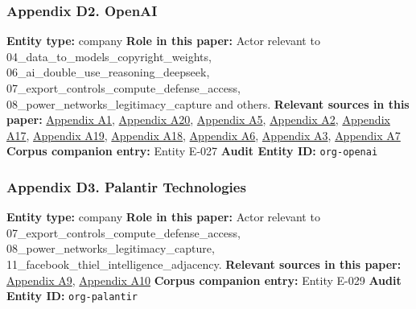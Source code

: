 \documentclass[
  american,
  11pt,
  letterpaper,
]{article}
\begin{document}
\subsubsection{Appendix D2. OpenAI}\label{appendix-d2-openai}

\textbf{Entity type:} company \textbf{Role in this paper:} Actor
relevant to 04\_data\_to\_models\_copyright\_weights,
06\_ai\_double\_use\_reasoning\_deepseek,
07\_export\_controls\_compute\_defense\_access,
08\_power\_networks\_legitimacy\_capture and others. \textbf{Relevant
sources in this paper:}
\hyperref[appendix-a1-openai-announces-leadership-transition]{Appendix
A1},
\hyperref[appendix-a20-openais-proposals-for-the-us-ai-action-plan]{Appendix
A20},
\hyperref[appendix-a5-openai-board-forms-safety-and-security-committee]{Appendix
A5},
\hyperref[appendix-a2-openai-appoints-former-top-us-cyberwarrior-paul-nakasone-to-its-board-of-directors]{Appendix
A2}, \hyperref[appendix-a17-musk-v-altman-4-24-cv-04722]{Appendix A17},
\hyperref[appendix-a19-judge-denies-elon-musks-attempt-to-immediately-block-openais-conversion-to-for-profit-entity]{Appendix
A19},
\hyperref[appendix-a18-judge-denies-elon-musk-s-request-to-block-openai-for-profit-conversion-but-welcomes-trial]{Appendix
A18},
\hyperref[appendix-a6-openai-appoints-one-of-wall-street-s-most-powerful-dealmakers-to-its-board]{Appendix
A6},
\hyperref[appendix-a3-anthropic-outspends-openai-in-biggest-ever-lobbying-quarter]{Appendix
A3}, \hyperref[appendix-a7-introducing-openai-for-government]{Appendix
A7} \textbf{Corpus companion entry:} Entity E-027 \textbf{Audit Entity
ID:} \texttt{org-openai}

\subsubsection{Appendix D3. Palantir
Technologies}\label{appendix-d3-palantir-technologies}

\textbf{Entity type:} company \textbf{Role in this paper:} Actor
relevant to 07\_export\_controls\_compute\_defense\_access,
08\_power\_networks\_legitimacy\_capture,
11\_facebook\_thiel\_intelligence\_adjacency. \textbf{Relevant sources
in this paper:}
\hyperref[appendix-a9-anthropic-and-palantir-partner-to-bring-claude-ai-models-to-aws-for-u-s-government-intelligence-and-defense-operations]{Appendix
A9},
\hyperref[appendix-a10-army-launches-detachment-201-executive-innovation-corps-to-drive-tech-transformation]{Appendix
A10} \textbf{Corpus companion entry:} Entity E-029 \textbf{Audit Entity
ID:} \texttt{org-palantir}
\end{document}
